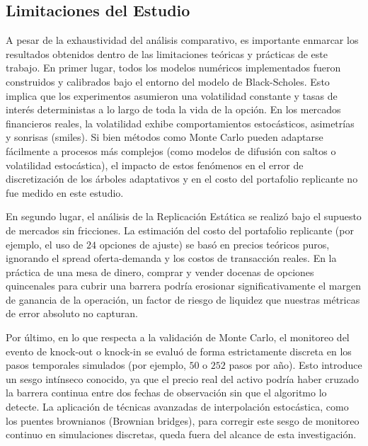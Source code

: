 \subsection{Limitaciones del Estudio}

A pesar de la exhaustividad del análisis comparativo, es importante enmarcar los resultados obtenidos dentro de las limitaciones teóricas y prácticas de este trabajo. En primer lugar, todos los modelos numéricos implementados fueron construidos y calibrados bajo el entorno del modelo de Black-Scholes. Esto implica que los experimentos asumieron una volatilidad constante y tasas de interés deterministas a lo largo de toda la vida de la opción. En los mercados financieros reales, la volatilidad exhibe comportamientos estocásticos, asimetrías y sonrisas (smiles). Si bien métodos como Monte Carlo pueden adaptarse fácilmente a procesos más complejos (como modelos de difusión con saltos o volatilidad estocástica), el impacto de estos fenómenos en el error de discretización de los árboles adaptativos y en el costo del portafolio replicante no fue medido en este estudio.

En segundo lugar, el análisis de la Replicación Estática se realizó bajo el supuesto de mercados sin fricciones. La estimación del costo del portafolio replicante (por ejemplo, el uso de $24$ opciones de ajuste) se basó en precios teóricos puros, ignorando el spread oferta-demanda y los costos de transacción reales. En la práctica de una mesa de dinero, comprar y vender docenas de opciones quincenales para cubrir una barrera podría erosionar significativamente el margen de ganancia de la operación, un factor de riesgo de liquidez que nuestras métricas de error absoluto no capturan.

Por último, en lo que respecta a la validación de Monte Carlo, el monitoreo del evento de knock-out o knock-in se evaluó de forma estrictamente discreta en los pasos temporales simulados (por ejemplo, $50$ o $252$ pasos por año). Esto introduce un sesgo intínseco conocido, ya que el precio real del activo podría haber cruzado la barrera continua entre dos fechas de observación sin que el algoritmo lo detecte. La aplicación de técnicas avanzadas de interpolación estocástica, como los puentes brownianos (Brownian bridges), para corregir este sesgo de monitoreo continuo en simulaciones discretas, queda fuera del alcance de esta investigación.
